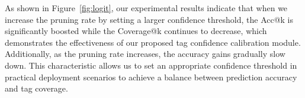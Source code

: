 

As shown in Figure~\ref{fig:logit}, our experimental results indicate that when we increase the pruning rate by setting a larger confidence threshold, the Acc@k is significantly boosted while the Coverage@k continues to decrease, which demonstrates the effectiveness of our proposed tag confidence calibration module. 
Additionally, as the pruning rate increases, the accuracy gains gradually slow down.
This characteristic allows us to set an appropriate confidence threshold in practical deployment scenarios to achieve a balance between prediction accuracy and tag coverage.






